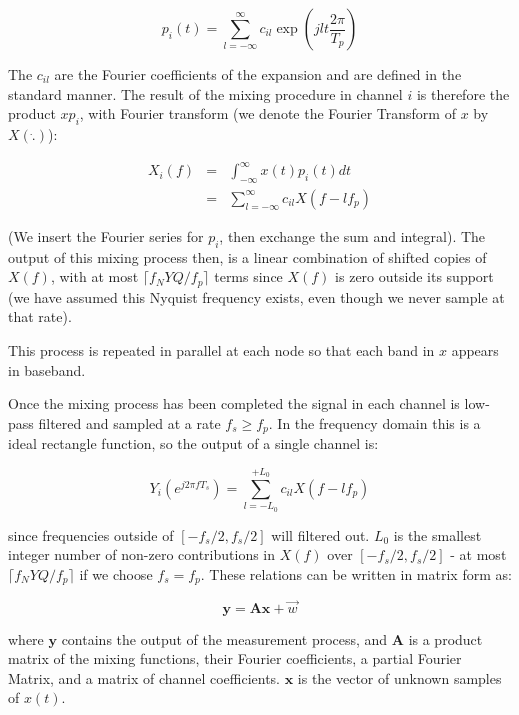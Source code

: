 \begin{equation}
p_i\left(t\right) = \sum_{l=-\infty}^{\infty} c_{il} \exp\left({jlt\frac{2\pi}{T_p}}\right)
\end{equation}

The \(c_{il}\) are the Fourier coefficients of the expansion and are defined in the standard manner. The result of the mixing procedure in channel \(i\) is therefore the product \(xp_i\), with Fourier transform (we denote the Fourier Transform of \(x\) by \(X\left( \dot{.} \right)\)):

\begin{align}
X_{i}\left(f\right) &=& \int_{-\infty}^{\infty} x\left(t\right) p_i\left(t\right) dt \nonumber
\\ &=& \sum_{l=-\infty}^{\infty} c_{il} X\left(f-lf_p\right)
\end{align}

(We insert the Fourier series for \(p_i\), then exchange the sum and integral). The output of this mixing process then, is a linear combination of shifted copies of \(X\left(f\right)\), with at most \(\lceil f_NYQ/f_p\rceil\) terms since \(X\left(f\right)\) is zero outside its support (we have assumed this Nyquist frequency exists, even though we never sample at that rate).

This process is repeated in parallel at each node so that each band in \(x\) appears in baseband.

Once the mixing process has been completed the signal in each channel is low-pass filtered and sampled at a rate \(f_s \geq f_p\). In the frequency domain this is a ideal rectangle function, so the output of a single channel is:

\begin{equation}
Y_i\left(e^{j 2 \pi f T_s }\right) = \sum_{l = -L_0}^{+L_0} c_{il} X\left(f-lf_p\right)
\end{equation}

since frequencies outside of \([-f_s/2, f_s/2]\) will filtered out. \(L_0\) is the smallest integer number of non-zero contributions in \(X\left(f\right)\) over \([-f_s/2, f_s/2]\) - at most \(\lceil f_NYQ/f_p\rceil\) if we choose \(f_s = f_p\). These relations can be written in matrix form as:

\begin{equation}
\textbf{y} = \textbf{A}\textbf{x} + \vec{w}
\label{system}
\end{equation}

where \(\textbf{y}\) contains the output of the measurement process, and \(\textbf{A}\) is a product matrix of the mixing functions, their Fourier coefficients, a partial Fourier Matrix, and a matrix of channel coefficients. \(\textbf{x}\) is the vector of unknown samples of \(x\left(t\right)\). 

